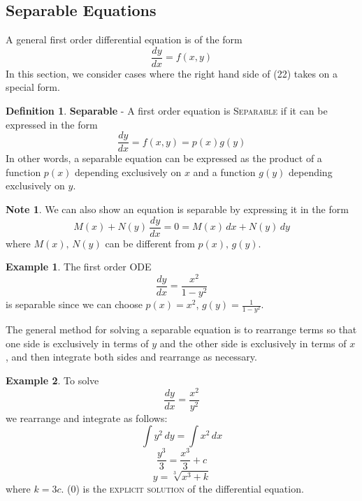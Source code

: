 \documentclass[11pt]{article}
\theoremstyle{definition}
\newtheorem{defn}{Definition}
\newtheorem{ex}{Example}
\newtheorem*{note*}{Note}
\begin{document}
\subsection{Separable Equations}
A general first order differential equation is of the form \begin{equation}
    \frac{dy}{dx} = f(x,y)
\end{equation}
In this section, we consider cases where the right hand side of (22) takes on a special form.
\begin{shaded}
\begin{defn}
\textbf{Separable} - A first order equation is \textsc{Separable} if it can be expressed in the form \begin{equation}
    \frac{dy}{dx} = f(x,y) = p(x)g(y)
\end{equation} In other words, a separable equation can be expressed as the product of a function $p(x)$ depending exclusively on $x$ and a function $g(y)$ depending exclusively on $y$.
\end{defn}
\end{shaded}
\begin{note*}
    We can also show an equation is separable by expressing it in the form \begin{equation}
    M(x) + N(y)\,\frac{dy}{dx} = 0 = M(x)\,dx + N(y)\,dy
\end{equation} where $M(x),\, N(y)$ can be different from $p(x),\, g(y)$.
\end{note*}
\begin{ex}
    The first order ODE \begin{equation}
        \frac{dy}{dx} = \frac{x^2}{1 - y^2}
    \end{equation} is separable since we can choose $p(x) = x^2$, $g(y) = \frac{1}{1 - y^2}$.
\end{ex} The general method for solving a separable equation is to rearrange terms so that one side is exclusively in terms of $y$ and the other side is exclusively in terms of $x$, and then integrate both sides and rearrange as necessary. \begin{ex}
    To solve \begin{equation}
        \frac{dy}{dx} = \frac{x^2}{y^2}
    \end{equation}we rearrange and integrate as follows: \begin{equation}
        \int y^2\,dy = \int x^2\,dx
    \end{equation}
    \begin{equation}
        \frac{y^3}{3} = \frac{x^3}{3} + c
    \end{equation}
    \begin{equation}
        y = \sqrt[3]{x^3 + k}
    \end{equation} where $k = 3c$. (0) is the \textsc{explicit solution} of the differential equation.
\end{ex}
\end{document}
